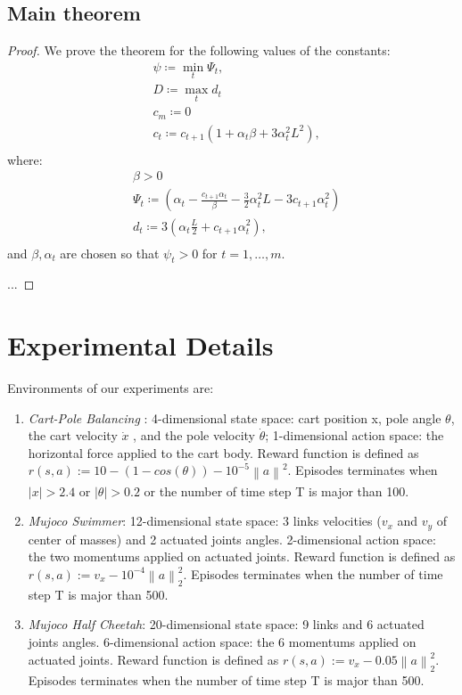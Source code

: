 \documentclass{article}
\theoremstyle{remark}
\theoremstyle{definition}
\newcommand{\norm}[2][\infty]{\left\|#2\right\|_{#1}}
\begin{document}
\subsection*{Main theorem}

\convergence*
\begin{proof}
We prove the theorem for the following values of the constants:
\begin{align*}
& \psi \coloneqq \min_t\Psi_t, \\
& D \coloneqq \max_t d_t \\
& c_m \coloneqq 0 \\
& c_t \coloneqq c_{t+1}(1+\alpha_t\beta+3\alpha_t^2L^2), \\
\end{align*}
where:
\begin{align*}
	& \beta > 0 \\
	& \Psi_t \coloneqq (\alpha_t - \frac{c_{t+1}\alpha_t}{\beta} - \frac{3}{2}\alpha_t^2L - 3c_{t+1}\alpha_t^2) \\
	& d_t \coloneqq 3(\alpha_t\frac{L}{2} + c_{t+1}\alpha_t^2), \\
\end{align*}
and $\beta,\alpha_t$ are chosen so that $\psi_t > 0$ for $t=1,\dots,m$.

...
\end{proof}

\section{Experimental Details}\label{app:proofs}
Environments of our experiments are:
\begin{enumerate}
	\item \emph{Cart-Pole Balancing} : 4-dimensional state space: cart position x, pole angle $\theta$, the cart velocity $\dot{x}$ , and the pole velocity $\dot{\theta}$; 1-dimensional action space: the horizontal force applied to the cart body. Reward function  is defined as $r(s, a) := 10 - (1 - cos(\theta)) - 10^{-5}\norm[] a^2$. Episodes terminates when $|x|>2.4$ or $|\theta|>0.2$ or the number of time step T is major than 100.
	\item \emph{Mujoco Swimmer}: 12-dimensional state space: 3 links velocities ($v_x$ and $v_y$ of center of masses) and 2 actuated joints angles. 2-dimensional action space: the two momentums applied on actuated joints.  Reward function is defined as $r(s, a) := v_x - 10^{-4}\norm[2] a^2$. Episodes terminates when the number of time step T is major than 500.
	\item \emph{Mujoco Half Cheetah}: 20-dimensional state space: 9 links and 6 actuated joints angles. 6-dimensional action space: the 6 momentums applied on actuated joints.  Reward function is defined as $r(s, a) := v_x - 0.05\norm[2] a^2$. Episodes terminates when the number of time step T is major than 500.
\end{enumerate}
\end{document}
